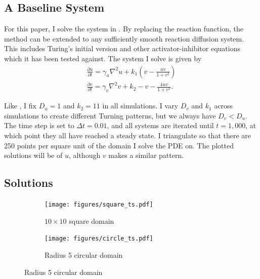 \subsection{A Baseline System}

For this paper, I solve the system in \autocites{othmer2009intersection}{jeong2017numerical}. By replacing the reaction function, the method can be extended to any sufficiently smooth reaction diffusion system. This includes Turing's initial version \parencites{turing1990chemical}{de2020leopard} and other activator-inhibitor equations \parencites{landge2020pattern}{meinhardt2000pattern} which it has been tested against. The system I solve is given by
\begin{align*}
    \frac{\partial u}{\partial t} = \gamma_u \nabla^2 u + k_1 \left(v - \frac{uv}{1 + v^2}\right) \\
    \frac{\partial v}{\partial t} = \gamma_v \nabla^2 v + k_2 - v - \frac{4 u v}{1 + v^2}.
\end{align*}

Like \autocite{jeong2017numerical}, I fix $D_u = 1$ and $k_2 = 11$ in all simulations. I vary $D_v$ and $k_1$ across simulations to create different Turning patterns, but we always have $D_v< D_u$. The time step is set to $\Delta t = 0.01$, and all systems are iterated until $t = 1,000$, at which point they all have reached a steady state. I triangulate so that there are 250 points per square unit of the domain I solve the PDE on. The plotted solutions will be of $u$, although $v$ makes a similar pattern.


\subsection{Solutions}

\begin{figure}[t!]
    \centering
    \caption{Solutions to the reaction diffusion system}

    \begin{subfigure}{\textwidth}
        \centering
        \texttt{[image: figures/square\_ts.pdf]}
        \caption{$10 \times 10$ square domain}
    \end{subfigure}

    \begin{subfigure}{\textwidth}
        \centering
        \texttt{[image: figures/circle\_ts.pdf]}
        \caption{Radius 5 circular domain}
    \end{subfigure}

    \label{fig:sol-ts}
\end{figure}


